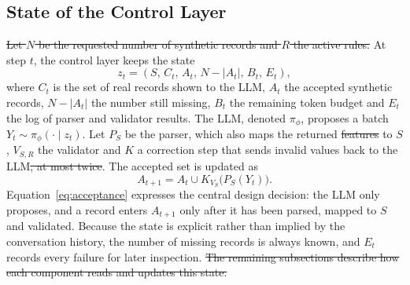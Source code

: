 \documentclass[conference]{IEEEtran}
\providecommand{\DIFaddtex}[1]{{\protect\color{blue}\uwave{#1}}} %
\providecommand{\DIFdeltex}[1]{{\protect\color{red}\sout{#1}}}                      %
\providecommand{\DIFaddbegin}{} %
\providecommand{\DIFaddend}{} %
\providecommand{\DIFdelbegin}{} %
\providecommand{\DIFdelend}{} %
\providecommand{\DIFadd}[1]{\texorpdfstring{\DIFaddtex{#1}}{#1}} %
\providecommand{\DIFdel}[1]{\texorpdfstring{\DIFdeltex{#1}}{}} %
\newcommand{\DIFscaledelfig}{0.5}
\newlength{\DIFdelgraphicswidth} %
\newlength{\DIFdelgraphicsheight} %
\newcommand{\DIFaddincludegraphics}[2][]{{\color{blue}\fbox{\DIFOincludegraphics[#1]{#2}}}} %
\newcommand{\DIFdelincludegraphics}[2][]{%
\sbox{\DIFdelgraphicsbox}{\DIFOincludegraphics[#1]{#2}}%
\settoboxwidth{\DIFdelgraphicswidth}{\DIFdelgraphicsbox} %
\settoboxtotalheight{\DIFdelgraphicsheight}{\DIFdelgraphicsbox} %
\scalebox{\DIFscaledelfig}{%
\parbox[b]{\DIFdelgraphicswidth}{\usebox{\DIFdelgraphicsbox}\\[-\baselineskip] \rule{\DIFdelgraphicswidth}{0em}}\llap{\resizebox{\DIFdelgraphicswidth}{\DIFdelgraphicsheight}{%
\setlength{\unitlength}{\DIFdelgraphicswidth}%
\begin{picture}(1,1)%
\thicklines\linethickness{2pt} %
{\color[rgb]{1,0,0}\put(0,0){\framebox(1,1){}}}%
{\color[rgb]{1,0,0}\put(0,0){\line( 1,1){1}}}%
{\color[rgb]{1,0,0}\put(0,1){\line(1,-1){1}}}%
\end{picture}%
}\hspace*{3pt}}} %
} %
\DeclareRobustCommand{\DIFaddbegin}{\DIFOaddbegin \let\includegraphics\DIFaddincludegraphics} %
\DeclareRobustCommand{\DIFaddend}{\DIFOaddend \let\includegraphics\DIFOincludegraphics} %
\DeclareRobustCommand{\DIFdelbegin}{\DIFOdelbegin \let\includegraphics\DIFdelincludegraphics} %
\DeclareRobustCommand{\DIFdelend}{\DIFOaddend \let\includegraphics\DIFOincludegraphics} %
\begin{document}
\DIFaddend \subsection{State of the Control Layer}
\DIFdelbegin \DIFdel{Let $N$ be the requested number of synthetic records and $R$ the active rules. }\DIFdelend At step $t$, the control layer keeps the state
\DIFdelbegin %
\DIFdelend \DIFaddbegin \begin{equation}
z_t=(S,\,C_t,\,A_t,\,N-|A_t|,\,B_t,\,E_t),
\label{eq:state}
\end{equation}\DIFaddend 
where $C_t$ is the set of real records shown to the LLM, $A_t$ the accepted synthetic records, $N-|A_t|$ the number still missing, $B_t$ the remaining token budget and $E_t$ the log of parser and validator results. The LLM, denoted $\pi_{\phi}$, proposes a batch $Y_t\sim\pi_{\phi}(\cdot\mid z_t)$. Let $P_S$ be the parser, which also maps the returned \DIFdelbegin \DIFdel{features }\DIFdelend \DIFaddbegin \DIFadd{columns }\DIFaddend to $S$, \DIFdelbegin \DIFdel{$V_{S,R}$ }\DIFdelend \DIFaddbegin \DIFadd{$V_S$ }\DIFaddend the validator and $K$ a correction step that sends invalid values back to the LLM\DIFdelbegin \DIFdel{, at most twice}\DIFdelend . The accepted set is updated as
\DIFdelbegin %
\DIFdelend \DIFaddbegin \begin{equation}
A_{t+1}=A_t\cup K_{V_S}\bigl(P_S(Y_t)\bigr).
\label{eq:acceptance}
\end{equation}\DIFaddend 
Equation~\eqref{eq:acceptance} expresses the central design decision: the LLM only proposes, and a record enters $A_{t+1}$ only after it has been parsed, mapped to $S$ and validated. Because the state is explicit rather than implied by the conversation history, the number of missing records is always known, and $E_t$ records every failure for later inspection.
\DIFdelbegin \DIFdel{The remaining subsections describe how each component reads and updates this state.
}\DIFdelend 
\end{document}
